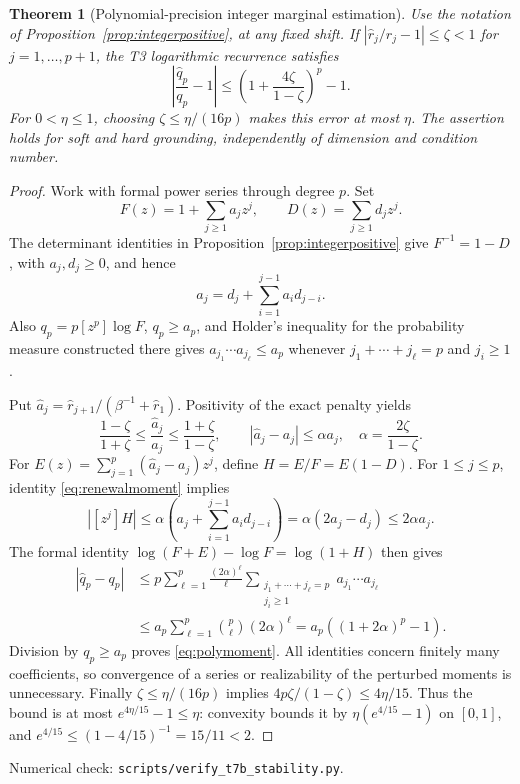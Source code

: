 \documentclass[11pt]{article}
\newtheorem{theorem}{Theorem}
\begin{document}
\begin{theorem}[Polynomial-precision integer marginal estimation]
\label{thm:polymoment}
Use the notation of Proposition~\ref{prop:integerpositive}, at any
fixed shift. If $|\widehat r_j/r_j-1|\leq\zeta<1$ for
$j=1,\ldots,p+1$, the T3 logarithmic recurrence satisfies
\begin{equation}\label{eq:polymoment}
 \left|\frac{\widehat q_p}{q_p}-1\right|
 \leq \left(1+\frac{4\zeta}{1-\zeta}\right)^p-1.
\end{equation}
For $0<\eta\leq1$, choosing $\zeta\leq\eta/(16p)$ makes this
error at most $\eta$. The assertion holds for soft and hard grounding,
independently of dimension and condition number.
\end{theorem}
\begin{proof}
Work with formal power series through degree $p$. Set
\[
 F(z)=1+\sum_{j\geq1}a_jz^j,\qquad
 D(z)=\sum_{j\geq1}d_jz^j.
\]
The determinant identities in Proposition~\ref{prop:integerpositive}
give $F^{-1}=1-D$, with $a_j,d_j\geq0$, and hence
\begin{equation}\label{eq:renewalmoment}
 a_j=d_j+\sum_{i=1}^{j-1}a_i d_{j-i}.
\end{equation}
Also $q_p=p[z^p]\log F$, $q_p\geq a_p$, and Holder's inequality
for the probability measure constructed there gives
$a_{j_1}\cdots a_{j_\ell}\leq a_p$ whenever
$j_1+\cdots+j_\ell=p$ and $j_i\geq1$.

Put $\widehat a_j=\widehat r_{j+1}/(\beta^{-1}+\widehat r_1)$.
Positivity of the exact penalty yields
\[
 \frac{1-\zeta}{1+\zeta}\leq\frac{\widehat a_j}{a_j}
 \leq\frac{1+\zeta}{1-\zeta},\qquad
 |\widehat a_j-a_j|\leq\alpha a_j,\quad
 \alpha=\frac{2\zeta}{1-\zeta}.
\]
For $E(z)=\sum_{j=1}^p(\widehat a_j-a_j)z^j$, define
$H=E/F=E(1-D)$. For $1\leq j\leq p$, identity
\eqref{eq:renewalmoment} implies
\[
 |[z^j]H|\leq\alpha\left(a_j+
          \sum_{i=1}^{j-1}a_i d_{j-i}\right)
 =\alpha(2a_j-d_j)\leq2\alpha a_j.
\]
The formal identity $\log(F+E)-\log F=\log(1+H)$ then gives
\begin{align*}
 |\widehat q_p-q_p|
 &\leq p\sum_{\ell=1}^p\frac{(2\alpha)^\ell}{\ell}
   \sum_{\substack{j_1+\cdots+j_\ell=p\\j_i\geq1}}
            a_{j_1}\cdots a_{j_\ell}\\
 &\leq a_p\sum_{\ell=1}^p\binom p\ell(2\alpha)^\ell
 =a_p((1+2\alpha)^p-1).
\end{align*}
Division by $q_p\geq a_p$ proves \eqref{eq:polymoment}.
All identities concern finitely many coefficients, so convergence
of a series or realizability of the perturbed moments is unnecessary.
Finally $\zeta\leq\eta/(16p)$ implies
$4p\zeta/(1-\zeta)\leq4\eta/15$.
Thus the bound is at most $e^{4\eta/15}-1\leq\eta$:
convexity bounds it by $\eta(e^{4/15}-1)$ on $[0,1]$, and
$e^{4/15}\leq(1-4/15)^{-1}=15/11<2$.
\end{proof}
\noindent Numerical check: \texttt{scripts/verify\_t7b\_stability.py}.
\end{document}

